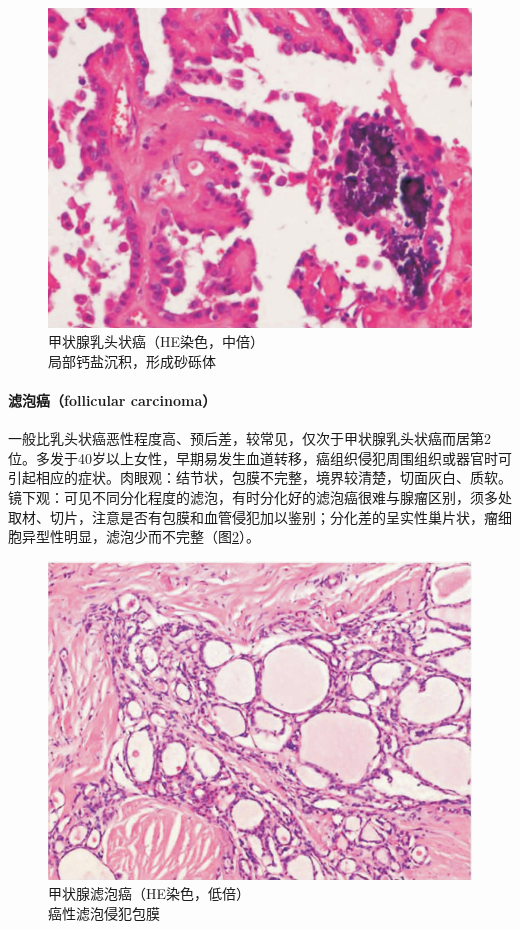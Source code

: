 \begin{figure}[!htbp]
 \centering
 \includegraphics{./images/Image00212.jpg}
 \captionsetup{justification=centering}
 \caption{甲状腺乳头状癌（HE染色，中倍）\\ {\small 局部钙盐沉积，形成砂砾体}}
\label{fig12-5}
  \end{figure}

\paragraph{滤泡癌（follicular carcinoma）}
一般比乳头状癌恶性程度高、预后差，较常见，仅次于甲状腺乳头状癌而居第2位。多发于40岁以上女性，早期易发生血道转移，癌组织侵犯周围组织或器官时可引起相应的症状。肉眼观：结节状，包膜不完整，境界较清楚，切面灰白、质软。镜下观：可见不同分化程度的滤泡，有时分化好的滤泡癌很难与腺瘤区别，须多处取材、切片，注意是否有包膜和血管侵犯加以鉴别；分化差的呈实性巢片状，瘤细胞异型性明显，滤泡少而不完整（图\ref{fig12-6}）。

\begin{figure}[!htbp]
 \centering
 \includegraphics{./images/Image00213.jpg}
 \captionsetup{justification=centering}
 \caption{甲状腺滤泡癌（HE染色，低倍）\\ {\small 癌性滤泡侵犯包膜}}
\label{fig12-6}
  \end{figure}

